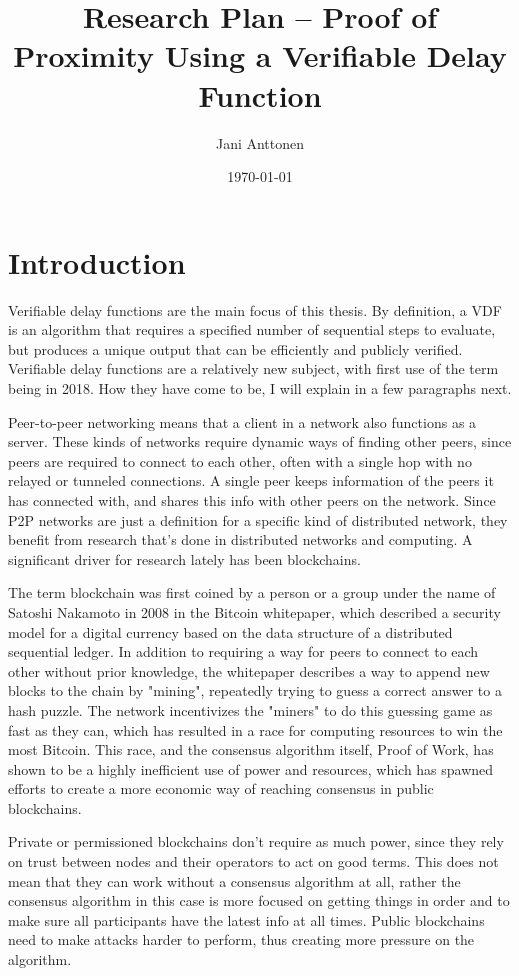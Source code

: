 \documentclass[a4paper,12pt]{article}
\title{Research Plan – Proof of Proximity Using a Verifiable Delay Function}
\author{Jani Anttonen}
\date{\today}
\begin{document}

\maketitle        %

\section{Introduction}
Verifiable delay functions are the main focus of this thesis. By definition, a VDF is an algorithm that requires a specified number of sequential steps to evaluate, but produces a unique output that can be efficiently and publicly verified.\cite{boneh_verifiable_2018} Verifiable delay functions are a relatively new subject, with first use of the term being in 2018. How they have come to be, I will explain in a few paragraphs next.

Peer-to-peer networking means that a client in a network also functions as a server. These kinds of networks require dynamic ways of finding other peers, since peers are required to connect to each other, often with a single hop with no relayed or tunneled connections. A single peer keeps information of the peers it has connected with, and shares this info with other peers on the network. Since P2P networks are just a definition for a specific kind of distributed network, they benefit from research that's done in distributed networks and computing. A significant driver for research lately has been blockchains.

The term blockchain was first coined by a person or a group under the name of Satoshi Nakamoto in 2008 in the Bitcoin whitepaper, which described a security model for a digital currency based on the data structure of a distributed sequential ledger.\cite{nakamoto_bitcoin_nodate} In addition to requiring a way for peers to connect to each other without prior knowledge, the whitepaper describes a way to append new blocks to the chain by "mining", repeatedly trying to guess a correct answer to a hash puzzle. The network incentivizes the "miners" to do this guessing game as fast as they can, which has resulted in a race for computing resources to win the most Bitcoin. This race, and the consensus algorithm itself, Proof of Work, has shown to be a highly inefficient use of power and resources, which has spawned efforts to create a more economic way of reaching consensus in public blockchains. 

Private or permissioned blockchains don't require as much power, since they rely on trust between nodes and their operators to act on good terms. This does not mean that they can work without a consensus algorithm at all, rather the consensus algorithm in this case is more focused on getting things in order and to make sure all participants have the latest info at all times. Public blockchains need to make attacks harder to perform, thus creating more pressure on the algorithm.
\end{document}
